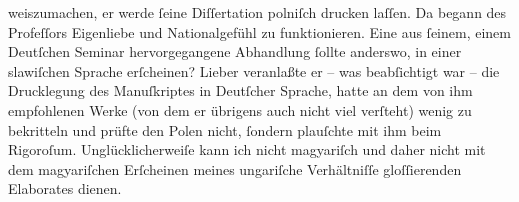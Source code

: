                weiszumachen, er werde ſeine Diſſertation polniſch drucken laſſen. Da begann des Profeſſors Eigenliebe und Nationalgefühl zu funktionieren.
               Eine aus ſeinem, einem Deutſchen Seminar hervorgegangene Abhandlung ſollte anderswo,
               in einer slawiſchen Sprache erſcheinen? Lieber veranlaßte er – was beabſichtigt war –
               die Drucklegung des Manuſkriptes in Deutſcher Sprache, {\pb}hatte an dem von ihm empfohlenen Werke (von dem er übrigens auch
               nicht viel verſteht) wenig zu bekritteln und prüfte den Polen nicht, ſondern plauſchte mit ihm beim
               Rigoroſum. Unglücklicherweiſe kann ich nicht magyariſch und daher nicht mit dem magyariſchen Erſcheinen meines ungariſche Verhältniſſe gloſſierenden Elaborates dienen.\pend
           
